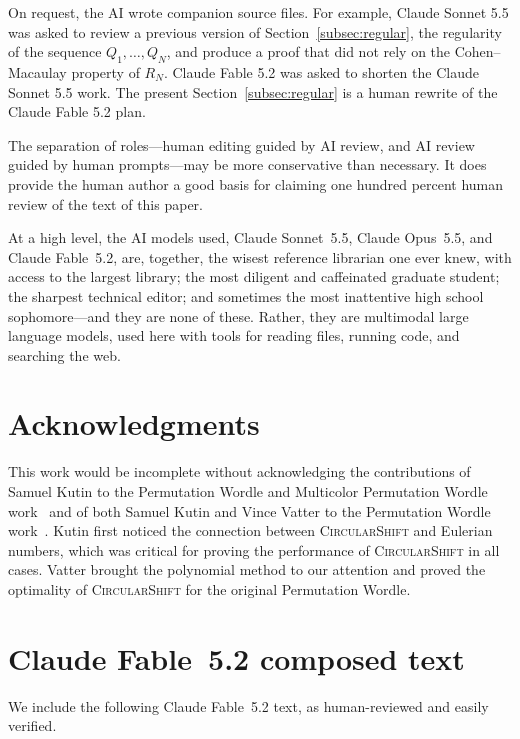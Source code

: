 \documentclass[12pt]{amsart}
\theoremstyle{definition}
\theoremstyle{remark}
\newcommand\classic{Permutation Wordle\xspace}
\newcommand\rainbow{Multicolor Permutation Wordle\xspace}
\newcommand\basicstrat{\mbox{\textnormal{\textsc{CircularShift}}}\xspace}
\newcommand\KSV{monthly-kutin-smithline-vatter}
\begin{document}
On request, the AI wrote companion source files.
For example, Claude Sonnet 5.5 was asked to review a previous version of
Section~\ref{subsec:regular}, the regularity of 
 the sequence $Q_1, \ldots, Q_N$, and produce a proof that did not rely on the Cohen--Macaulay
 property of $R_N$.  Claude Fable 5.2 was asked to shorten the Claude Sonnet 5.5 work.
 The present Section~\ref{subsec:regular} is a human rewrite of the Claude Fable 5.2 plan.

The separation of roles---human editing guided by AI review, and AI review guided
  by human prompts---may be more conservative than necessary.  It does provide the human author a good basis for claiming one hundred percent human review of the text of this paper.

At a high level, the AI models used, Claude Sonnet~5.5, Claude Opus~5.5,
and Claude Fable~5.2, are, together, the wisest reference librarian one ever knew, 
with access to the largest library; the most diligent and
caffeinated graduate student; the sharpest technical editor; and sometimes
the most inattentive high school sophomore---and they are none of these.
Rather, they are multimodal large language models, used here with tools for reading
files, running code, and searching the web.




\section*{Acknowledgments}
    This work would be incomplete without acknowledging the contributions of
    Samuel Kutin to the \classic and \rainbow work~\cite{arxiv-kutin-smithline} and 
    of both Samuel Kutin and Vince Vatter to the \classic work~\cite{\KSV}.
    Kutin first noticed the connection between \basicstrat and 
    Eulerian numbers, which was critical for proving the performance of
    \basicstrat in all cases.
    Vatter brought the polynomial method to our attention and proved the
        optimality of \basicstrat for the original \classic.
    





\appendix

\section{Claude Fable~5.2 composed text}\label{app:fable-include}

We include the following Claude Fable~5.2 text, as human-reviewed and easily verified.
\end{document}
